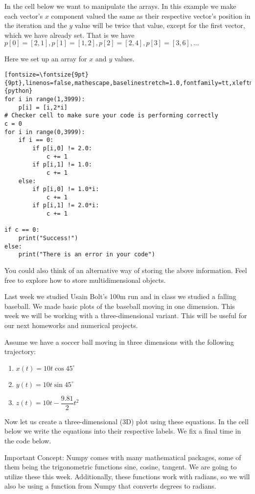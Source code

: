 \documentclass[%
oneside,                 %
final,                   %
10pt]{article}
\begin{document}
In the cell below we want to manipulate the arrays.
In this example we make each vector's $x$ component valued the same as their respective vector's position in the iteration and the $y$ value will be twice that value, except for  the first vector, which we have already set. 
That is we have $p[0] = [2,1], p[1] = [1,2], p[2] = [2,4], p[3] = [3,6], ...$

Here we set up an array for $x$ and $y$ values. 
\begin{verbatim}[fontsize=\fontsize{9pt}{9pt},linenos=false,mathescape,baselinestretch=1.0,fontfamily=tt,xleftmargin=7mm]{python}
for i in range(1,3999):
    p[i] = [i,2*i]
# Checker cell to make sure your code is performing correctly
c = 0
for i in range(0,3999):
    if i == 0:
        if p[i,0] != 2.0:
            c += 1
        if p[i,1] != 1.0:
            c += 1
    else:
        if p[i,0] != 1.0*i:
            c += 1
        if p[i,1] != 2.0*i:
            c += 1

if c == 0:
    print("Success!")
else:
    print("There is an error in your code")
\end{verbatim}

You could also think of an alternative way of storing the above information. Feel free to explore how to store
multidimensional objects. 


Last week we studied Usain Bolt's 100m run and in class we studied a falling baseball. We made basic plots of the baseball
moving in one dimension. This week we will be working with a three-dimensional variant. This will be useful for our next homeworks and numerical projects. 

Assume we have a soccer ball moving in three dimensions with the following trajectory:

\begin{enumerate}
\item $x(t) = 10t\cos{45^{\circ}} $

\item $y(t) = 10t\sin{45^{\circ}} $

\item $z(t) = 10t - \dfrac{9.81}{2}t^2$
\end{enumerate}

\noindent
Now let us create a three-dimensional (3D) plot using these equations. In the cell below
we write the equations into their respective labels. We fix a final time in the code below.

Important Concept: Numpy comes with many mathematical packages, some
of them being the trigonometric functions sine, cosine, tangent. We
are going to utilize these this week. Additionally, these functions
work with radians, so we will also be using a function from Numpy that
converts degrees to radians.
\end{document}
